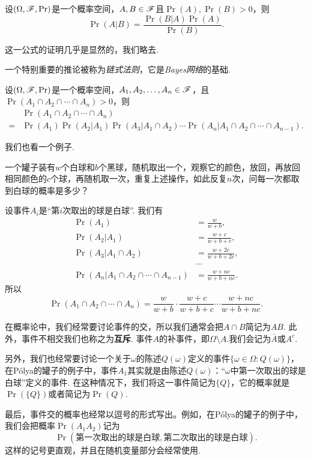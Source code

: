 \begin{theorem}[贝叶斯公式]\label{thm:bayes}
设$(\Omega,\mathscr{F},\Pr)$是一个概率空间，$A,B\in\mathscr{F}$且$\Pr(A),\Pr(B)>0$，则
\[
    \Pr(A|B) = \frac{\Pr(B|A)\Pr(A)}{\Pr(B)}.
\]
\end{theorem}

这一公式的证明几乎是显然的，我们略去. 

一个特别重要的推论被称为\emph{链式法则}，它是\emph{Bayes网络}的基础. 

\begin{corollary}[链式法则]\label{cor:chain-rule}
设$(\Omega,\mathscr{F},\Pr)$是一个概率空间，$A_1,A_2,\ldots,A_n\in\mathscr{F}$，且$\Pr(A_1\cap A_2\cap\cdots\cap A_n)>0$，则
\begin{align*}
    &\Pr(A_1\cap A_2\cap\cdots\cap A_n)\\
    = &\Pr(A_1)\Pr(A_2|A_1)\Pr(A_3|A_1\cap A_2)\cdots\Pr(A_n|A_1\cap A_2\cap\cdots\cap A_{n-1}).
\end{align*}
\end{corollary}

我们也看一个例子. 

\begin{example}[P\'olya的罐子]
    一个罐子装有$w$个白球和$b$个黑球，随机取出一个，观察它的颜色，放回，再放回相同颜色的$c$个球，再随机取一次，重复上述操作，如此反复$n$次，问每一次都取到白球的概率是多少？

    设事件$A_i$是“第$i$次取出的球是白球”. 我们有
\begin{align*}
    \Pr(A_1)&=\frac{w}{w+b},\\
    \Pr(A_2|A_1)&=\frac{w+c}{w+b+c},\\
    \Pr(A_3|A_1\cap A_2)&=\frac{w+2c}{w+b+2c},\\
    &\cdots\\
    \Pr(A_n|A_1\cap A_2\cap\cdots\cap A_{n-1})&=\frac{w+nc}{w+b+nc}.
\end{align*}
    所以
\[
    \Pr(A_1\cap A_2\cap\cdots\cap A_n) = \frac{w}{w+b}\cdot\frac{w+c}{w+b+c}\cdots\frac{w+nc}{w+b+nc}.
\]
\end{example}

\begin{remark}
    在概率论中，我们经常要讨论事件的交，所以我们通常会把$A\cap B$简记为$AB$. 此外，事件不相交我们也称之为\textbf{互斥}. 事件$A$的补事件，即$\Omega\setminus A$.我们会记为$\bar{A}$或$A^c$.
    
    另外，我们也经常要讨论一个关于$\omega$的陈述$Q(\omega)$定义的事件$\{\omega\in\Omega:Q(\omega)\}$，在P\'olya的罐子的例子中，事件$A_1$其实就是由陈述$Q(\omega)$：“$\omega$中第一次取出的球是白球”定义的事件. 在这种情况下，我们将这一事件简记为$\{Q\}$，它的概率就是$\Pr(\{Q\})$或者简记为$\Pr(Q)$. 
    
    最后，事件交的概率也经常以逗号的形式写出。例如，在P\'olya的罐子的例子中，我们会把概率$\Pr(A_1A_2)$记为
    \[\Pr(\text{第一次取出的球是白球},\text{第二次取出的球是白球}).\] 
    这样的记号更直观，并且在随机变量部分会经常使用. 
\end{remark}

